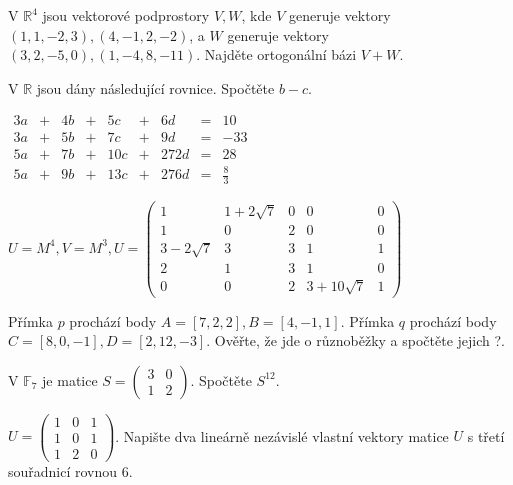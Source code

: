 \begin{questions}

\question V \(\mathbb{R}^4\) jsou vektorové podprostory \(V, W\), kde \(V\) generuje vektory \((1,1,-2,3), (4,-1, 2,-2)\), a \(W\) generuje vektory \((3,2,-5,0),(1,-4,8,-11)\). Najděte ortogonální bázi \(V+W\).

\question V \(\mathbb{R}\) jsou dány následující rovnice. Spočtěte \(b-c\). \begin{center}
    \(\begin{matrix}
        3a & + & 4b & + &  5c & + &   6d & = & 10\\
        3a & + & 5b & + &  7c & + &   9d & = & -33\\
        5a & + & 7b & + & 10c & + & 272d & = & 28\\
        5a & + & 9b & + & 13c & + & 276d & = & \frac{8}{3}
    \end{matrix}\)
\end{center}

\newpage
\question \(U=M^4, V=M^3, U=\begin{pmatrix}
              1 & 1+2\sqrt{7} & 0 &            0 & 0\\
              1 &           0 & 2 &            0 & 0\\
    3-2\sqrt{7} &           3 & 3 &            1 & 1\\
              2 &           1 & 3 &            1 & 0\\
              0 &           0 & 2 & 3+10\sqrt{7} & 1
\end{pmatrix}\)

\question Přímka \(p\) prochází body \(A=[7,2,2], B=[4,-1,1]\). Přímka \(q\) prochází body \(C=[8,0,-1], D=[2,12,-3]\). Ověřte, že jde o různoběžky a spočtěte jejich ?.

\newpage
\question V \(\mathbb{F}_7\) je matice \(S = \begin{pmatrix}
    3 & 0\\
    1 & 2
\end{pmatrix}\). Spočtěte \(S^{12}\).

\question \(U = \begin{pmatrix}
    1 & 0 & 1\\
    1 & 0 & 1\\
    1 & 2 & 0
\end{pmatrix}\). Napište dva lineárně nezávislé vlastní vektory matice \(U\) s třetí souřadnicí rovnou 6.
\end{questions}
